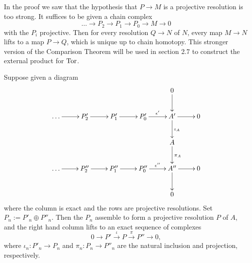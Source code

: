 \begin{porism}
	In the proof we saw that the hypothesis that $P\rightarrow M$ is a projective resolution is too strong.
	It suffices to be given a chain complex
	$$\dots \rightarrow P_2 \rightarrow P_1 \rightarrow P_0 \rightarrow M \rightarrow 0$$
	with the $P_i$ projective.
	Then for every resolution $Q\rightarrow N$ of $N$, every map $M\rightarrow N$ lifts to a map $P\rightarrow Q$, which is unique up to chain homotopy.
	This stronger version of the Comparison Theorem will be used in section 2.7 to construct the external product for $\operatorname{Tor}$.
\end{porism}

\begin{lemma}
	Suppose given a diagram
	\begin{align*}
		\xymatrix{
			& & & &0 \ar[d] & \\
			\dots \ar[r] &P'_2 \ar[r] &P'_1 \ar[r] &P'_0 \ar[r]^{\epsilon'} &A' \ar[r] \ar[d]^{\iota_A} &0 \\
			& & & &A \ar[d]^{\pi_A} & \\
			\dots \ar[r] &P''_2 \ar[r] &P''_1 \ar[r] &P''_0 \ar[r]^{\epsilon''} &A'' \ar[r] \ar[d] &0 \\
			& & & &0 & 
		}
	\end{align*}
	where the column is exact and the rows are projective resolutions. Set $P_n:=P'_n\oplus P''_n$. Then the $P_n$ assemble to form a projective resolution $P$ of $A$, and the right hand column lifts to an exact sequence of complexes
	$$0\rightarrow P' \overset{\iota}{\longrightarrow} P \overset{\pi}{\longrightarrow} P'' \rightarrow 0,$$
	where $\iota_n:P'_n\rightarrow P_n$ and $\pi_n:P_n\rightarrow P''_n$ are the natural inclusion and projection, respectively.
\end{lemma}


